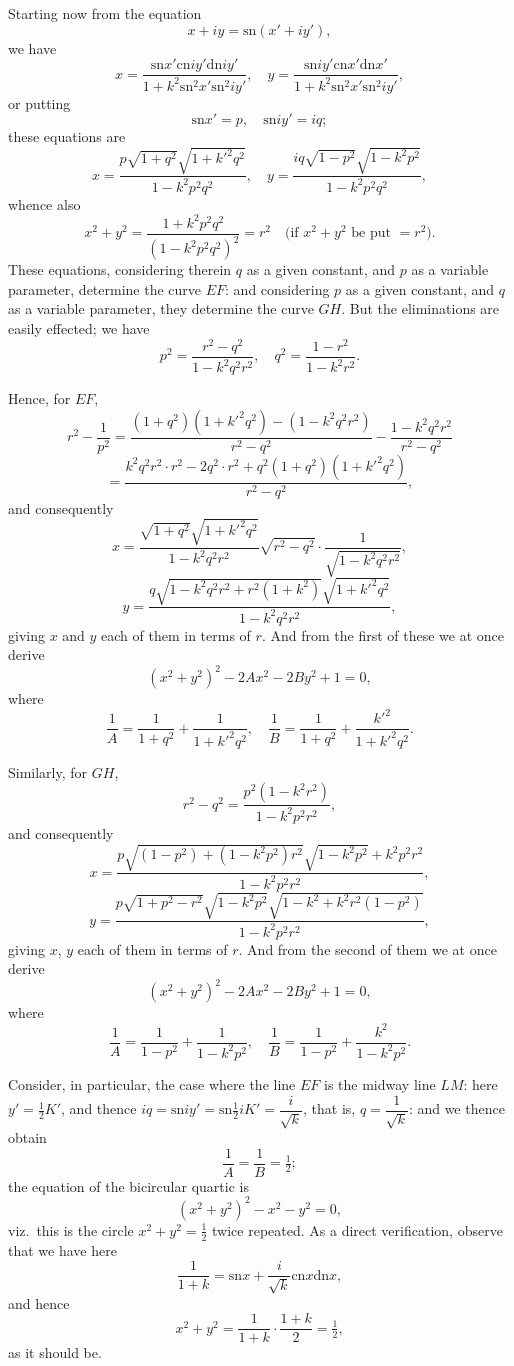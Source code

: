 \documentclass[11pt,a4paper]{book}
\providecommand{\sn}{\mathrm{sn}}
\providecommand{\cn}{\mathrm{cn}}
\providecommand{\dn}{\mathrm{dn}}
\begin{document}
Starting now from the equation
\[
x + iy = \sn(x' + iy'),
\]
we have
\[
x = \frac{\sn x' \cn iy' \dn iy'}{1 + k^2 \sn^2 x' \sn^2 iy'},\quad y = \frac{\sn iy' \cn x' \dn x'}{1 + k^2 \sn^2 x' \sn^2 iy'},
\]
or putting
\[
\sn x' = p,\quad \sn iy' = iq;
\]
these equations are
\[
x = \frac{p\sqrt{1+q^2}\sqrt{1+k'^2q^2}}{1-k^2p^2q^2},\quad y = \frac{iq\sqrt{1-p^2}\sqrt{1-k^2p^2}}{1-k^2p^2q^2},
\]
whence also
\[
x^2 + y^2 = \frac{1+k^2p^2q^2}{(1-k^2p^2q^2)^2} = r^2\quad \text{(if $x^2+y^2$ be put $=r^2$).}
\]
These equations, considering therein $q$ as a given constant, and $p$ as a variable parameter, determine the curve $EF$: and considering $p$ as a given constant, and $q$ as a variable parameter, they determine the curve $GH$. But the eliminations are easily effected; we have
\[
p^2 = \frac{r^2-q^2}{1-k^2q^2r^2},\quad q^2 = \frac{1-r^2}{1-k^2r^2}.
\]

Hence, for $EF$,
\[
r^2 - \frac{1}{p^2} = \frac{(1+q^2)(1+k'^2q^2) - (1-k^2q^2r^2)}{r^2-q^2} - \frac{1-k^2q^2r^2}{r^2-q^2}
\]
\[
= \frac{k^2q^2r^2 \cdot r^2 - 2q^2 \cdot r^2 + q^2(1+q^2)(1+k'^2q^2)}{r^2-q^2},
\]
and consequently
\[
x = \frac{\sqrt{1+q^2}\sqrt{1+k'^2q^2}}{1-k^2q^2r^2}\sqrt{r^2-q^2} \cdot \frac{1}{\sqrt{1-k^2q^2r^2}},
\]
\[
y = \frac{q\sqrt{1-k^2q^2r^2 + r^2(1+k^2)}\sqrt{1+k'^2q^2}}{1-k^2q^2r^2},
\]
giving $x$ and $y$ each of them in terms of $r$. And from the first of these we at once derive
\[
(x^2+y^2)^2 - 2Ax^2 - 2By^2 + 1 = 0,
\]
where
\[
\frac{1}{A} = \frac{1}{1+q^2} + \frac{1}{1+k'^2q^2},\quad \frac{1}{B} = \frac{1}{1+q^2} + \frac{k'^2}{1+k'^2q^2}.
\]

Similarly, for $GH$,
\[
r^2 - q^2 = \frac{p^2(1-k^2r^2)}{1-k^2p^2r^2},
\]
and consequently
\[
x = \frac{p\sqrt{(1-p^2)+(1-k^2p^2)r^2}\sqrt{1-k^2p^2}+k^2p^2r^2}{1-k^2p^2r^2},
\]
\[
y = \frac{p\sqrt{1+p^2-r^2}\sqrt{1-k^2p^2}\sqrt{1-k^2+k^2r^2(1-p^2)}}{1-k^2p^2r^2},
\]
giving $x$, $y$ each of them in terms of $r$. And from the second of them we at once derive
\[
(x^2+y^2)^2 - 2Ax^2 - 2By^2 + 1 = 0,
\]
where
\[
\frac{1}{A} = \frac{1}{1-p^2} + \frac{1}{1-k^2p^2},\quad \frac{1}{B} = \frac{1}{1-p^2} + \frac{k^2}{1-k^2p^2}.
\]

Consider, in particular, the case where the line $EF$ is the midway line $LM$: here $y' = \tfrac{1}{2}K'$, and thence $iq = \sn iy' = \sn \tfrac{1}{2}iK' = \dfrac{i}{\sqrt{k}}$, that is, $q = \dfrac{1}{\sqrt{k}}$: and we thence obtain
\[
\frac{1}{A} = \frac{1}{B} = \tfrac{1}{2};
\]
the equation of the bicircular quartic is
\[
(x^2+y^2)^2 - x^2 - y^2 = 0,
\]
viz.\ this is the circle $x^2+y^2 = \tfrac{1}{2}$ twice repeated. As a direct verification, observe that we have here
\[
\frac{1}{1+k} = \sn x + \frac{i}{\sqrt{k}} \cn x \dn x,
\]
and hence
\[
x^2 + y^2 = \frac{1}{1+k}\cdot\frac{1+k}{2} = \tfrac{1}{2},
\]
as it should be.
\end{document}
